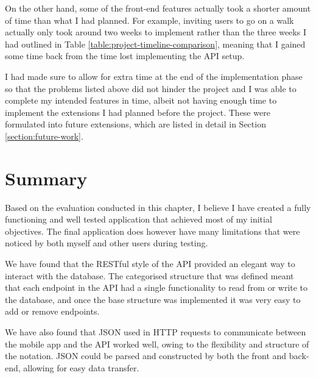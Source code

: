 On the other hand, some of the front-end features actually took a shorter amount of time than what I had planned. For example, inviting users to go on a walk actually only took around two weeks to implement rather than the three weeks I had outlined in Table \ref{table:project-timeline-comparison}, meaning that I gained some time back from the time lost implementing the API setup.

I had made sure to allow for extra time at the end of the implementation phase so that the problems listed above did not hinder the project and I was able to complete my intended features in time, albeit not having enough time to implement the extensions I had planned before the project. These were formulated into future extensions, which are listed in detail in Section \ref{section:future-work}.

\section{Summary}

Based on the evaluation conducted in this chapter, I believe I have created a fully functioning and well tested application that achieved most of my initial objectives. The final application does however have many limitations that were noticed by both myself and other users during testing. 

We have found that the RESTful style of the API provided an elegant way to interact with the database. The categorised structure that was defined meant that each endpoint in the API had a single functionality to read from or write to the database, and once the base structure was implemented it was very easy to add or remove endpoints.

We have also found that JSON used in HTTP requests to communicate between the mobile app and the API worked well, owing to the flexibility and structure of the notation. JSON could be parsed and constructed by both the front and back-end, allowing for easy data transfer.

